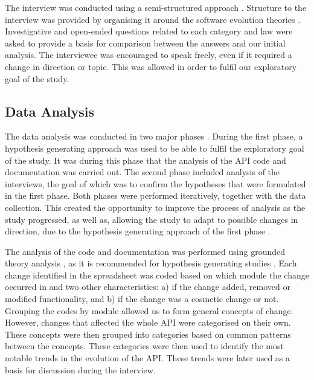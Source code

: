 \documentclass{sig-alternate}
\begin{document}
The interview was conducted using a semi-structured approach \cite{robson2002real}. Structure to the interview was provided by organising it around the software evolution theories \cite{chapin2001types} \cite{lehman1980programs}. Investigative and open-ended questions related to each category and law were asked to provide a basis for comparison between the answers and our initial analysis. The interviewee was encouraged to speak freely, even if it required a change in direction or topic. This was allowed in order to fulfil our exploratory goal of the study. 


\subsection{Data Analysis} \label{data_analysis}
The data analysis was conducted in two major phases \cite{andersson2007spiral}. During the first phase, a hypothesis generating approach \cite{seaman1999qualitative} was used to be able to fulfil the exploratory goal of the study. It was during this phase that the analysis of the API code and documentation was carried out. The second phase included analysis of the interviews, the goal of which was to confirm the hypotheses \cite{seaman1999qualitative} that were formulated in the first phase. Both phases were performed iteratively, together with the data collection. This created the opportunity to improve the process of analysis as the study progressed, as well as, allowing the study to adapt to possible changes in direction, due to the hypothesis generating approach of the first phase \cite{andersson2007spiral}. 

The analysis of the code and documentation was performed using grounded theory analysis \cite{seaman1999qualitative}, as it is recommended for hypothesis generating studies \cite{runeson2009guidelines} \cite{seaman1999qualitative}.
Each change identified in the spreadsheet was coded based on which module the change occurred in and two other characteristics: a) if the change added, removed or modified functionality, and b) if the change was a cosmetic change or not.
Grouping the codes by module allowed us to form general concepts of change. However, changes that affected the whole API were categorised on their own.
These concepts were then grouped into categories based on common patterns between the concepts.
These categories were then used to identify the most notable trends in the evolution of the API. These trends were later used as a basis for discussion during the interview.
\end{document}
